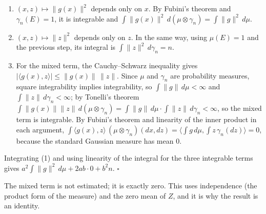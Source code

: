 \documentclass[11pt,a4paper]{article}
\begin{document}
\begin{enumerate}


\item \((x,z)\mapsto\|g(x)\|^2\) depends only on \(x\). By Fubini's theorem and \(\gamma_n(E)=1\), it is integrable and \(\int\|g(x)\|^2\,d(\mu\otimes\gamma_n)=\int\|g\|^2\,d\mu\).

\item \((x,z)\mapsto\|z\|^2\) depends only on \(z\). In the same way, using \(\mu(E)=1\) and the previous step, its integral is \(\int\|z\|^2\,d\gamma_n=n\).

\item For the mixed term, the Cauchy–Schwarz inequality gives \(|\langle g(x),z\rangle|\le\|g(x)\|\,\|z\|\). Since \(\mu\) and \(\gamma_n\) are probability measures, square integrability implies integrability, so \(\int\|g\|\,d\mu<\infty\) and \(\int\|z\|\,d\gamma_n<\infty\); by Tonelli's theorem \(\int\|g(x)\|\|z\|\,d(\mu\otimes\gamma_n)=\int\|g\|\,d\mu\cdot\int\|z\|\,d\gamma_n<\infty\), so the mixed term is integrable. By Fubini's theorem and linearity of the inner product in each argument, \(\int\langle g(x),z\rangle\,(\mu\otimes\gamma_n)(dx,dz)=\bigl\langle\int g\,d\mu,\int z\,\gamma_n(dz)\bigr\rangle=0\), because the standard Gaussian measure has mean \(0\).

\end{enumerate}



Integrating (1) and using linearity of the integral for the three integrable terms gives \(a^2\int\|g\|^2\,d\mu+2ab\cdot0+b^2n\). \(\square\)




The mixed term is not estimated; it is exactly zero. This uses independence (the product form of the measure) and the zero mean of \(Z\), and it is why the result is an identity.
\end{document}
